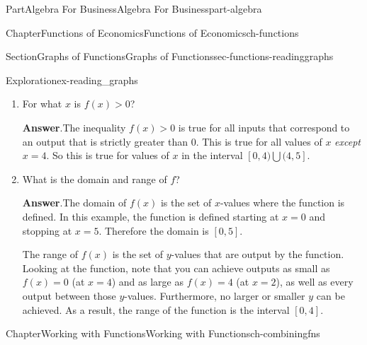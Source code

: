 \documentclass[oneside,10pt,]{tufte-book}
\newcommand{\blocktitlefont}{\relax}
\numberwithin{equation}{chapter}
\newcommand{\gt}{>}
\begin{document}
\begin{partptx}{Part}{Algebra For Business}{}{Algebra For Business}{}{}{part-algebra}
\begin{chapterptx}{Chapter}{Functions of Economics}{}{Functions of Economics}{}{}{ch-functions}
\begin{sectionptx}{Section}{Graphs of Functions}{}{Graphs of Functions}{}{}{sec-functions-readinggraphs}
\begin{exploration}{Exploration}{}{ex-reading_graphs}
\begin{enumerate}[font=\bfseries,label=(\alph*),ref=\alph*]
\begin{image}{0.25}{0.5}{0.25}{}
{
}%
\end{image}%
\item{}For what  \(x\) is \(f(x)>0\)?%
\par\smallskip%
\noindent\textbf{\blocktitlefont Answer}.\hypertarget{ex-reading_graphs-6-2}{}\quad{}The inequality \(f(x)\gt 0\) is true for all inputs that correspond to an output that is strictly greater than 0. This is true for all values of \(x\) \emph{except} \(x=4\). So this is true for values of \(x\) in the interval \([0,4)\bigcup(4,5]\).%
\item{}What is the domain and range of \(f\)?%
\par\smallskip%
\noindent\textbf{\blocktitlefont Answer}.\hypertarget{ex-reading_graphs-7-2}{}\quad{}The domain of \(f(x)\) is the set of \(x\)-values where the function is defined.  In this example, the function is defined starting at \(x=0\) and stopping at \(x=5\). Therefore the domain is \([0,5]\).%
\par
The range of \(f(x)\) is the set of \(y\)-values that are output by the function.  Looking at the function, note that you can achieve outputs as small as \(f(x)=0\) (at \(x=4\)) and as large as \(f(x)=4\) (at \(x=2\)), as well as every output between those \(y\)-values. Furthermore, no larger or smaller \(y\) can be achieved.  As a result, the range of the function is the interval \([0,4]\).%
\end{enumerate}%
\end{exploration}%
\end{sectionptx}
\end{chapterptx}
%
\typeout{************************************************}
\typeout{************************************************}
%
\begin{chapterptx}{Chapter}{Working with Functions}{}{Working with Functions}{}{}{ch-combiningfns}
\renewcommand*{\chaptername}{Chapter}
%
%
\typeout{************************************************}
\typeout{************************************************}

\end{chapterptx}
\end{partptx}
\end{document}
